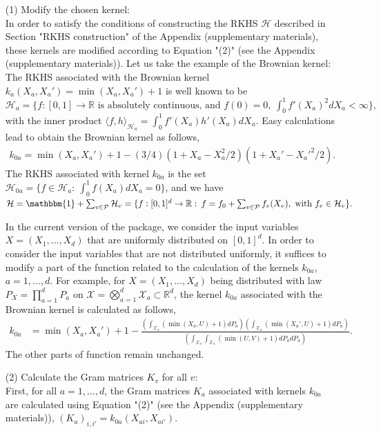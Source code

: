 \begin{itemize}
\item[(1)] Modify the chosen kernel:\\ 
In order to satisfy the conditions of constructing the RKHS $\mathcal{H}$ described in Section "RKHS construction" of the Appendix (supplementary materials), these kernels are modified according to Equation "(2)" (see the Appendix (supplementary materials)). Let us take the example of the Brownian kernel:\\
The RKHS associated with the Brownian kernel $k_a(X_a,X_a')=\min(X_a,X_a')+1$ is well known to be $\mathcal{H}_a=\{f:[0,1]\rightarrow \mathbb{R} \mbox{ is absolutely continuous, and }f(0)=0,\:\int_0^1{f'(X_a)}^2dX_a<\infty\},$
with the inner product $\langle f,h\rangle_{\mathcal{H}_a}=\int_0^1f'(X_a)h'(X_a)dX_a.$ 
Easy calculations lead to obtain the Brownian kernel as follows,
\begin{align*}
k_{0a}=\min(X_a,X_a')+1-(3/4)(1+X_a-{X_a^2/2})(1+X_a'-{X_a'^2/2}).
\end{align*}
The RKHS associated with kernel $k_{0a}$ is the set $\mathcal{H}_{0a}=\{f\in\mathcal{H}_a:\:\int_{0}^1f(X_a)dX_a=0\}$, and we have $\mathcal{H}= \mathbbm{1} + \sum_{v \in \mathcal{P}} \mathcal{H}_{v}=\{f:[0,1]^d\rightarrow\mathbb{R}:\:f=f_0+\sum_{v\in\mathcal{P}}f_v(X_v),\mbox{ with }f_v\in\mathcal{H}_v\}.$ 
\begin{rem}\label{ch3:remxun}
In the current version of the package, we consider the input variables $X=(X_1,...,X_d)$ that are uniformly distributed on $[0,1]^d$. In order to consider the input variables that are not distributed uniformly, it suffices to modify a part of the function  related to the calculation of the kernels $k_{0a}$, $a=1,...,d$. For example, for $X=(X_1,...,X_d)$ being distributed with law $P_X=\prod_{a=1}^d P_a$ on $\mathcal{X}=\bigotimes_{a=1}^d\mathcal{X}_a\subset\mathbb{R}^d$, the kernel $k_{0a}$ associated with the Brownian kernel is calculated as follows, 
\begin{align*}
k_{0a}&=\min (X_a,X_a')+1-\frac{(\int_{\mathcal{X}_a}(\min(X_a,U)+1)dP_a)(\int_{\mathcal{X}_a}(\min(X_a',U)+1)dP_a)}{(\int_{\mathcal{X}_a}\int_{\mathcal{X}_a}(\min(U,V)+1)dP_adP_a)}.
\end{align*}
The other parts of function  remain unchanged.
\end{rem}
\item[(2)] Calculate the Gram matrices $K_v$ for all $v$:\\
First, for all $a=1,...,d$, the Gram matrices $K_a$ associated with kernels $k_{0a}$ are calculated using Equation "(2)" (see the Appendix (supplementary materials)), $(K_a)_{i,i'}=k_{0a}(X_{ai},X_{ai'}).$

\end{itemize}

